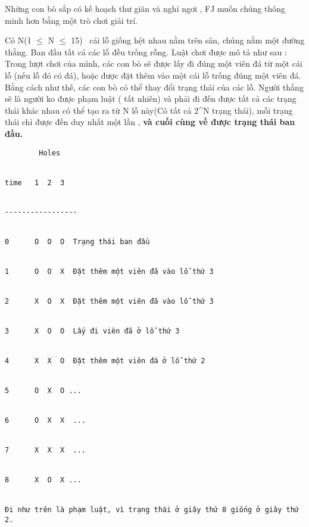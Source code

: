 Những con bò sắp có kế hoạch thư giãn và nghỉ ngơi , FJ muốn chúng thông minh hơn bằng một trò chơi giải trí.  

   Có N(1 $\le$ N $\le$ 15)  cái lỗ giống hệt nhau nằm trên sân, chúng nằm một đường thằng. Ban đầu tất cả các lỗ đều trống rỗng. Luật chơi được mô tả như sau : Trong lượt chơi của mình, các con bò sẽ được lấy đi đúng một viên đá từ một cái lỗ (nếu lỗ đó có đá), hoặc được đặt thêm vào một cái lỗ trống đúng một viên đá. Bằng cách như thế, các con bò có thể thay đổi trạng thái của các lỗ. Người thắng sẽ là người ko được phạm luật ( tất nhiên) và phải đi đến được tất cả các trạng thái khác nhau có thể tạo ra từ N lỗ này(Có tất cả 2^N trạng thái), mỗi trạng thái chỉ được đến duy nhất một lần ,   \textbf{    và cuối cùng về được trạng thái ban đầu.   }
\begin{verbatim}
        Holes


time   1  2  3 


-----------------


0      O  O  O  Trạng thái ban đầu


1      O  O  X  Đặt thêm một viên đã vào lỗ thứ 3


2      X  O  X  Đặt thêm một viên đã vào lỗ thứ 3


3      X  O  O  Lấy đi viên đã ở lỗ thứ 3


4      X  X  O  Đặt thêm một viên đá ở lỗ thứ 2


5      O  X  O ...


6      O  X  X  ...


7      X  X  X  ...


8      X  O  X ...


Đi như trên là phạm luật, vì trạng thái ở giây thứ 8 giống ở giây thứ 2.


\end{verbatim}